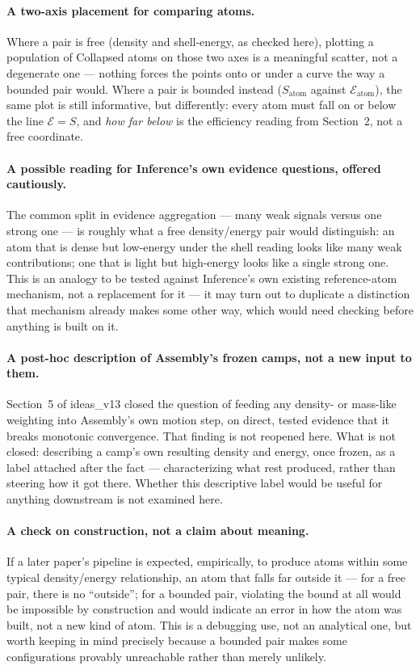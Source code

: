 \documentclass[11pt]{article}
\begin{document}
\paragraph{A two-axis placement for comparing atoms.} Where a pair is
free (density and shell-energy, as checked here), plotting a
population of Collapsed atoms on those two axes is a meaningful
scatter, not a degenerate one --- nothing forces the points onto or
under a curve the way a bounded pair would. Where a pair is bounded
instead ($S_{\text{atom}}$ against $\mathcal{E}_{\text{atom}}$),
the same plot is still informative, but differently: every atom
must fall on or below the line $\mathcal{E}=S$, and \emph{how far
below} is the efficiency reading from Section~2, not a free
coordinate.

\paragraph{A possible reading for Inference's own evidence
questions, offered cautiously.} The common split in evidence
aggregation --- many weak signals versus one strong one --- is
roughly what a free density/energy pair would distinguish: an atom
that is dense but low-energy under the shell reading looks like many
weak contributions; one that is light but high-energy looks like a
single strong one. This is an analogy to be tested against
Inference's own existing reference-atom mechanism, not a replacement
for it --- it may turn out to duplicate a distinction that mechanism
already makes some other way, which would need checking before
anything is built on it.

\paragraph{A post-hoc description of Assembly's frozen camps, not a
new input to them.} Section~5 of ideas\_v13 closed the question of
feeding any density- or mass-like weighting into Assembly's own
motion step, on direct, tested evidence that it breaks monotonic
convergence. That finding is not reopened here. What is not closed:
describing a camp's own resulting density and energy, once frozen,
as a label attached after the fact --- characterizing what rest
produced, rather than steering how it got there. Whether this
descriptive label would be useful for anything downstream is not
examined here.

\paragraph{A check on construction, not a claim about meaning.} If a
later paper's pipeline is expected, empirically, to produce atoms
within some typical density/energy relationship, an atom that falls
far outside it --- for a free pair, there is no ``outside''; for a
bounded pair, violating the bound at all would be impossible by
construction and would indicate an error in how the atom was built,
not a new kind of atom. This is a debugging use, not an analytical
one, but worth keeping in mind precisely because a bounded pair
makes some configurations provably unreachable rather than merely
unlikely.
\end{document}
